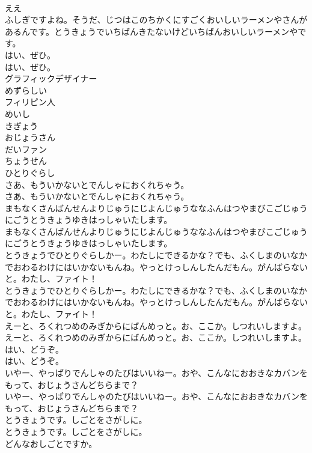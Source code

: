 \documentclass[8pt]{extreport}
\begin{document}
\begin{CJK}{UTF8}{min}
\\	ええ
\\	ふしぎですよね。そうだ、じつはこのちかくにすごくおいしいラーメンやさんがあるんです。とうきょうでいちばんきたないけどいちばんおいしいラーメンやです。
\\	はい、ぜひ。
\\	はい、ぜひ。
\\	グラフィックデザイナー
\\	めずらしい
\\	フィリピン人
\\	めいし
\\	きぎょう
\\	おじょうさん
\\	だいファン
\\	ちょうせん
\\	ひとりぐらし
\\	さあ、もういかないとでんしゃにおくれちゃう。
\\	さあ、もういかないとでんしゃにおくれちゃう。
\\	まもなくさんばんせんよりじゅうにじよんじゅうななふんはつやまびこごじゅうにごうとうきょうゆきはっしゃいたします。
\\	まもなくさんばんせんよりじゅうにじよんじゅうななふんはつやまびこごじゅうにごうとうきょうゆきはっしゃいたします。
\\	とうきょうでひとりぐらしかー。わたしにできるかな？でも、ふくしまのいなかでおわるわけにはいかないもんね。やっとけっしんしたんだもん。がんばらないと。わたし、ファイト！
\\	とうきょうでひとりぐらしかー。わたしにできるかな？でも、ふくしまのいなかでおわるわけにはいかないもんね。やっとけっしんしたんだもん。がんばらないと。わたし、ファイト！
\\	えーと、ろくれつめのみぎからにばんめっと。お、ここか。しつれいしますよ。
\\	えーと、ろくれつめのみぎからにばんめっと。お、ここか。しつれいしますよ。
\\	はい、どうぞ。
\\	はい、どうぞ。
\\	いやー、やっぱりでんしゃのたびはいいねー。おや、こんなにおおきなカバンをもって、おじょうさんどちらまで？
\\	いやー、やっぱりでんしゃのたびはいいねー。おや、こんなにおおきなカバンをもって、おじょうさんどちらまで？
\\	とうきょうです。しごとをさがしに。
\\	とうきょうです。しごとをさがしに。
\\	どんなおしごとですか。

\end{CJK}
\end{document}
